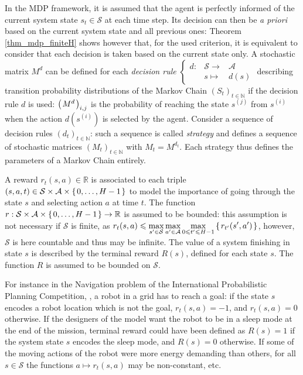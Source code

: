 In the MDP framework, it is assumed that 
the agent is perfectly informed 
of the current system state $s_t \in \mathcal{S}$
at each time step. 
Its decision can then be \textit{a priori} 
based on the current system state 
and all previous ones:
Theorem \ref{thm_mdp_finiteH}
shows however that, 
for the used criterion,
it is equivalent to consider 
that each decision is taken
based on the current state only.
A stochastic matrix $M^{d}$ can be defined for
each \textit{decision rule} $\left \{ \begin{array}{ccc}
d : & \mathcal{S} \rightarrow & \mathcal{A} \\
& s \mapsto & d(s)
 \end{array} \right.$ describing transition probability distributions  
of the Markov Chain $(S_t)_{t \in \mathbb{N}}$
if the decision rule $d$ is used: 
$\left( \left. M^{d} \right. \right)_{i,j}$ is the probability of reaching the state $s^{(j)}$ from $s^{(i)}$  
when the action $d(s^{(i)})$ is selected by the agent. 
Consider a sequence of decision rules
$(d_t)_{t \in \mathbb{N}}$: 
such a sequence is called \textit{strategy} 
and defines a sequence of stochastic matrices 
$(M_t)_{t \in \mathbb{N}}$ 
with $M_t=M^{d_t}$. 
Each strategy thus defines the parameters of a Markov Chain entirely. 

A reward $r_t(s,a) \in \mathbb{R}$ is associated 
to each triple $(s,a,t) \in \mathcal{S} \times \mathcal{A} \times \left\{ \left.  0, \ldots, H-1  \right. \right\}$
to model the importance of going through the state $s$
and selecting action $a$ at time $t$.
The function $r: \mathcal{S} \times \mathcal{A} \times \left\{ \left.  0, \ldots, H-1  \right. \right\} \rightarrow \mathbb{R}$
is assumed to be bounded:
this assumption is not necessary if 
$\mathcal{S}$ is finite, as 
$r_t(s,a) \leqslant \displaystyle \max_{s' \in \mathcal{S}}  \max_{ a' \in \mathcal{A}} \max_{ 0 \leqslant t' \leqslant H-1} \left\{ \left.  r_{t'}(s',a') \right. \right\}$,
however, $\mathcal{S}$ is here countable 
and thus may be infinite.
The value of a system finishing in state $s$
is described by the terminal reward $R(s)$, 
defined for each state $s$. The function $R$
is assumed to be bounded on $\mathcal{S}$.

For instance in the Navigation problem 
of the International Probabilistic Planning Competition,
\cite{SannerIPPC1111}, a robot in a grid has to reach a goal:
if the state $s$ encodes a robot location which is not the goal,
$r_t(s,a)=-1$, and $r_t(s,a)=0$ otherwise.
If the designers of the model want
the robot to be in a sleep mode
at the end of the mission,
terminal reward could have been defined
as $R(s)=1$ if the system state $s$ 
encodes the sleep mode, and $R(s)=0$ otherwise.
If some of the moving actions of the robot 
were more energy demanding than others,
for all $s \in \mathcal{S}$ 
the functions $a \mapsto r_t(s,a)$ may be non-constant, etc.

